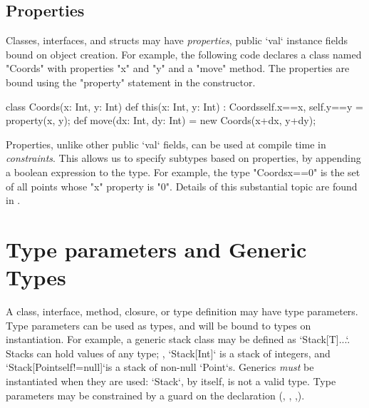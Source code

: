 {\subsection{Properties}
\label{properties}

Classes, interfaces, and structs may have {\em properties}, public \xcd`val` instance
fields bound on object creation. For example, the following code declares a
class named \xcd"Coords" with properties \xcd"x" and \xcd"y" and a \xcd"move"
method. The properties are bound using the \xcd"property" statement in the
constructor.

\begin{xten}
class Coords(x: Int, y: Int) {
  def this(x: Int, y: Int) : Coords{self.x==x, self.y==y} 
    = { property(x, y); }
  def move(dx: Int, dy: Int) = new Coords(x+dx, y+dy);
}
\end{xten}

Properties, unlike other public \xcd`val` fields, can be used  
at compile time in {\em constraints}. This allows us
to specify subtypes based on properties, by appending a boolean expression to
the type. For example, the type \xcd"Coords{x==0}" is the set of all points
whose \xcd"x" property is \xcd"0".  Details of this substantial topic are
found in .



\section{Type parameters and Generic Types}
\label{TypeParameters}

\label{Generics}

A class, interface, method, closure, or type definition  may have type
parameters.  Type parameters can be used as types, and will be bound to types
on instantiation.  For example, a generic stack class may be defined as 
\xcd`Stack[T]{...}`.  Stacks can hold values of any type; \eg, 
\xcd`Stack[Int]` is a stack of integers, and 
\xcd`Stack[Point{self!=null}]`is a stack of non-null \xcd`Point`s.
Generics {\em must} be instantiated when they are used: \xcd`Stack`, by
itself, is not a valid type.
Type parameters may be constrained by a guard on the declaration
(, ,
,).

}
